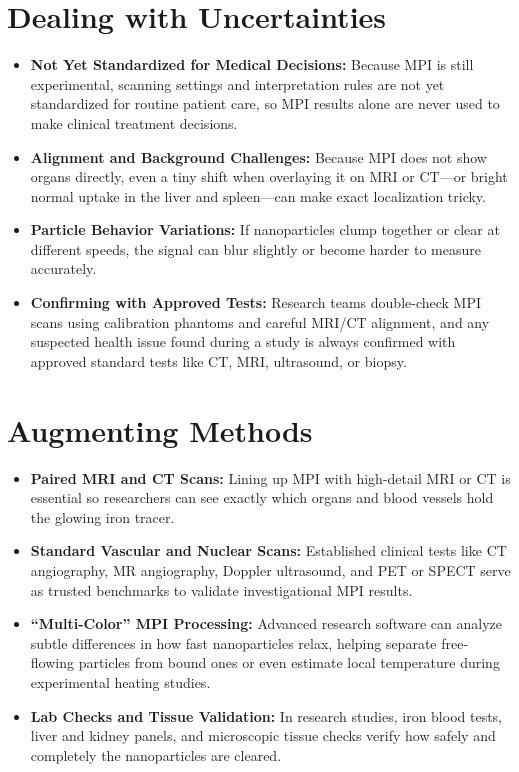 \section{Dealing with Uncertainties}

\begin{itemize}
    \item \textbf{Not Yet Standardized for Medical Decisions:} Because MPI is still experimental, scanning settings and interpretation rules are not yet standardized for routine patient care, so MPI results alone are never used to make clinical treatment decisions.
    \item \textbf{Alignment and Background Challenges:} Because MPI does not show organs directly, even a tiny shift when overlaying it on MRI or CT---or bright normal uptake in the liver and spleen---can make exact localization tricky.
    \item \textbf{Particle Behavior Variations:} If nanoparticles clump together or clear at different speeds, the signal can blur slightly or become harder to measure accurately.
    \item \textbf{Confirming with Approved Tests:} Research teams double-check MPI scans using calibration phantoms and careful MRI/CT alignment, and any suspected health issue found during a study is always confirmed with approved standard tests like CT, MRI, ultrasound, or biopsy.
\end{itemize}

\section{Augmenting Methods}

\begin{itemize}
    \item \textbf{Paired MRI and CT Scans:} Lining up MPI with high-detail MRI or CT is essential so researchers can see exactly which organs and blood vessels hold the glowing iron tracer.
    \item \textbf{Standard Vascular and Nuclear Scans:} Established clinical tests like CT angiography, MR angiography, Doppler ultrasound, and PET or SPECT serve as trusted benchmarks to validate investigational MPI results.
    \item \textbf{``Multi-Color'' MPI Processing:} Advanced research software can analyze subtle differences in how fast nanoparticles relax, helping separate free-flowing particles from bound ones or even estimate local temperature during experimental heating studies.
    \item \textbf{Lab Checks and Tissue Validation:} In research studies, iron blood tests, liver and kidney panels, and microscopic tissue checks verify how safely and completely the nanoparticles are cleared.
\end{itemize}

